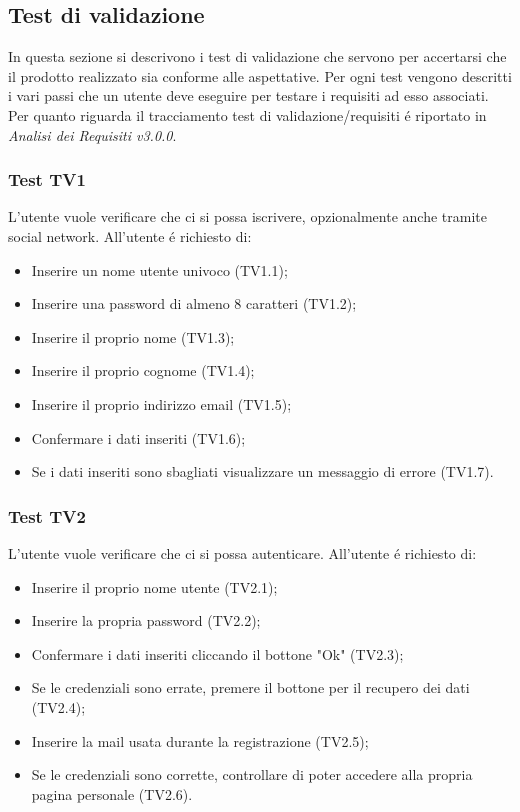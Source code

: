 \subsection{Test di validazione}
In questa sezione si descrivono i test di validazione che servono per accertarsi che il prodotto realizzato sia conforme alle aspettative.
Per ogni test vengono descritti i vari passi che un utente deve eseguire per testare i requisiti ad esso associati. Per quanto riguarda il tracciamento test di validazione/requisiti é riportato in \textit{Analisi dei Requisiti v3.0.0}.

\subsubsection{Test TV1}
L'utente vuole verificare che ci si possa iscrivere, opzionalmente anche tramite social network. \newline
All'utente é richiesto di:
\begin{itemize}
	\item Inserire un nome utente univoco (TV1.1);
	\item Inserire una password di almeno 8 caratteri (TV1.2);
	\item Inserire il proprio nome (TV1.3);
	\item Inserire il proprio cognome (TV1.4);
	\item Inserire il proprio indirizzo email (TV1.5);
	\item Confermare i dati inseriti (TV1.6);
	\item Se i dati inseriti sono sbagliati visualizzare un messaggio di errore (TV1.7).
\end{itemize}

\subsubsection{Test TV2}
L'utente vuole verificare che ci si possa autenticare. \newline
All'utente é richiesto di:
\begin{itemize}
	\item Inserire il proprio nome utente (TV2.1);
	\item Inserire la propria password (TV2.2);
	\item Confermare i dati inseriti cliccando il bottone "Ok" (TV2.3);
	\item Se le credenziali sono errate, premere il bottone per il recupero dei dati (TV2.4);
	\item Inserire la mail usata durante la registrazione (TV2.5);
	\item Se le credenziali sono corrette, controllare di poter accedere alla propria pagina personale (TV2.6).
\end{itemize}

